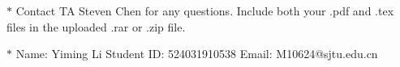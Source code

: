 \documentclass[12pt,a4paper]{article}
\theoremstyle{definition}
\begin{document}
\noindent

\noindent{}
\begin{center}
\footnotesize{\color{red}$*$ Contact TA Steven Chen for any questions. Include both your .pdf and .tex files in the uploaded .rar or .zip file.}

\footnotesize{\color{blue}$*$ Name: Yiming Li  \quad Student ID: 524031910538 \quad Email:  M10624@sjtu.edu.cn}
\end{center}
\end{document}
